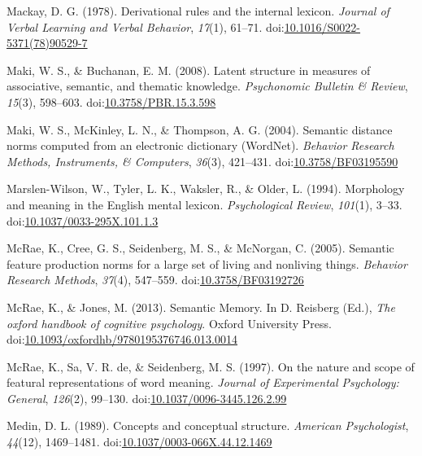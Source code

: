 \documentclass[english,,man]{apa6}
\begin{document}
\leavevmode\hypertarget{ref-MacKay1978}{}%
Mackay, D. G. (1978). Derivational rules and the internal lexicon. \emph{Journal of Verbal Learning and Verbal Behavior}, \emph{17}(1), 61--71. doi:\href{https://doi.org/10.1016/S0022-5371(78)90529-7}{10.1016/S0022-5371(78)90529-7}

\leavevmode\hypertarget{ref-Maki2008}{}%
Maki, W. S., \& Buchanan, E. M. (2008). Latent structure in measures of associative, semantic, and thematic knowledge. \emph{Psychonomic Bulletin \& Review}, \emph{15}(3), 598--603. doi:\href{https://doi.org/10.3758/PBR.15.3.598}{10.3758/PBR.15.3.598}

\leavevmode\hypertarget{ref-Maki2004}{}%
Maki, W. S., McKinley, L. N., \& Thompson, A. G. (2004). Semantic distance norms computed from an electronic dictionary (WordNet). \emph{Behavior Research Methods, Instruments, \& Computers}, \emph{36}(3), 421--431. doi:\href{https://doi.org/10.3758/BF03195590}{10.3758/BF03195590}

\leavevmode\hypertarget{ref-Marslen-Wilson1994}{}%
Marslen-Wilson, W., Tyler, L. K., Waksler, R., \& Older, L. (1994). Morphology and meaning in the English mental lexicon. \emph{Psychological Review}, \emph{101}(1), 3--33. doi:\href{https://doi.org/10.1037/0033-295X.101.1.3}{10.1037/0033-295X.101.1.3}

\leavevmode\hypertarget{ref-McRae2005}{}%
McRae, K., Cree, G. S., Seidenberg, M. S., \& McNorgan, C. (2005). Semantic feature production norms for a large set of living and nonliving things. \emph{Behavior Research Methods}, \emph{37}(4), 547--559. doi:\href{https://doi.org/10.3758/BF03192726}{10.3758/BF03192726}

\leavevmode\hypertarget{ref-McRae2013}{}%
McRae, K., \& Jones, M. (2013). Semantic Memory. In D. Reisberg (Ed.), \emph{The oxford handbook of cognitive psychology}. Oxford University Press. doi:\href{https://doi.org/10.1093/oxfordhb/9780195376746.013.0014}{10.1093/oxfordhb/9780195376746.013.0014}

\leavevmode\hypertarget{ref-McRae1997}{}%
McRae, K., Sa, V. R. de, \& Seidenberg, M. S. (1997). On the nature and scope of featural representations of word meaning. \emph{Journal of Experimental Psychology: General}, \emph{126}(2), 99--130. doi:\href{https://doi.org/10.1037/0096-3445.126.2.99}{10.1037/0096-3445.126.2.99}

\leavevmode\hypertarget{ref-Medin1989}{}%
Medin, D. L. (1989). Concepts and conceptual structure. \emph{American Psychologist}, \emph{44}(12), 1469--1481. doi:\href{https://doi.org/10.1037/0003-066X.44.12.1469}{10.1037/0003-066X.44.12.1469}
\end{document}
